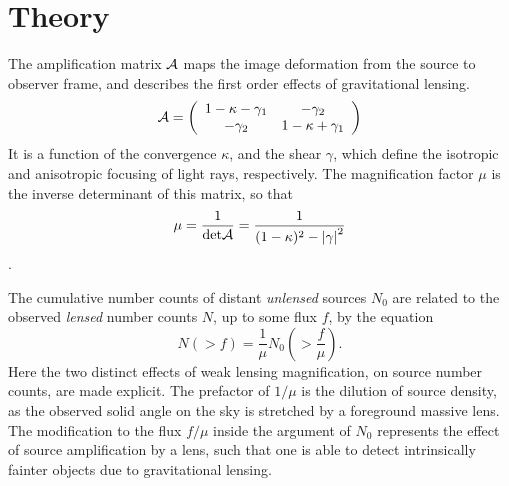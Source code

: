 \section{Theory}
\label{sec:theory2}
The amplification matrix $\cal{A}$ maps the image deformation from the source to observer frame, and describes the first order effects of gravitational lensing.  
\begin{equation}
\cal{A} = \left( \begin{array}{cc}
{1-\kappa-\gamma_1} & {-\gamma_2} \\
{-\gamma_2} & {1-\kappa+\gamma_1} \\
\end{array} \right) 
\end{equation}
It is a function of the convergence $\kappa$, and the shear $\gamma$, which define the isotropic and anisotropic focusing of light rays, respectively.  The magnification factor $\mu$ is the inverse determinant of this matrix, so that
\begin{equation}
\label{EQ:mu}
\mu = \frac{1}{\mathrm{det} \cal{A}} = 
\frac{1}{(1-\kappa)^2 - \left|\gamma\right|^2}
\end{equation}
\citep{BS01}.  

The cumulative number counts of distant {\it unlensed} sources $N_0$ are related to the observed {\it lensed} number counts $N$, up to some flux $f$, by the equation
\begin{equation}
N (>f) = \frac{1}{\mu} N_0 \left( > \frac{f}{\mu} \right).
\end{equation}
Here the two distinct effects of weak lensing magnification, on source number counts, are made explicit.  The prefactor of $1 / \mu$ is the dilution of source density, as the observed solid angle on the sky is stretched by a foreground massive lens.  The modification to the flux $f / \mu$ inside the argument of $N_0$ represents the effect of source amplification by a lens, such that one is able to detect intrinsically fainter objects due to gravitational lensing.

